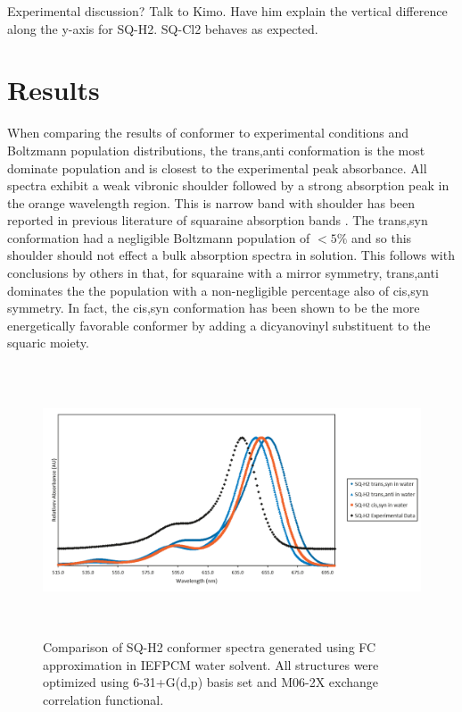 \documentclass[journal=jacsat,manuscript=article]{achemso}
\begin{document}
Experimental discussion? Talk to Kimo. Have him explain the vertical difference along the y-axis for SQ-H2. SQ-Cl2 behaves as expected.

\section{Results}
When comparing the results of conformer to experimental conditions and Boltzmann population distributions, the trans,anti conformation is the most dominate population and is closest to the experimental peak absorbance. All spectra exhibit a weak vibronic shoulder followed by a strong absorption peak in the orange wavelength region. This is narrow band with shoulder has been reported in previous literature of squaraine absorption bands \citep{Qin2013ACells,Zheng2015ContributionDevices,Yang2017ThePerformance,Borrelli2014TheoreticalDye,Kuster2015CoupledPendulums,Brixner2017ExcitonSystems}. The trans,syn conformation had a negligible Boltzmann population of $<5\%$ and so this shoulder should not effect a bulk absorption spectra in solution. This follows with conclusions by others in that, for squaraine with a mirror symmetry, trans,anti dominates the the population with a non-negligible percentage also of cis,syn symmetry\cite{Borrelli2014TheoreticalDye}. In fact, the cis,syn conformation has been shown to be the more energetically favorable conformer by adding a dicyanovinyl substituent to the squaric moiety\cite{Qin2013ACells}.  


\begin{figure}[h]
    \centering
    \includegraphics[width=16cm,height=8cm]{figures/sq1_conformer_exp.png}
    \caption{Comparison of SQ-H2 conformer spectra generated using FC approximation in IEFPCM water solvent. All structures were optimized  using 6-31+G(d,p) basis set and M06-2X exchange correlation functional.}
    \label{fig:SQ1 conformers}
\end{figure}
\end{document}
